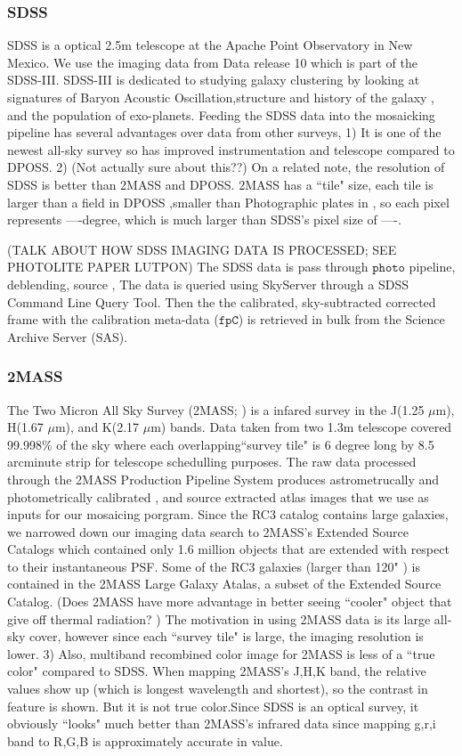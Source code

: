 \documentclass[5p]{elsarticle}
\begin{document}
	\subsubsection{SDSS}
	SDSS is a optical 
	2.5m telescope at the Apache Point Observatory in New Mexico. We use the imaging data from Data release 10 which is part of the SDSS-III. SDSS-III is dedicated to studying galaxy clustering by looking at signatures of Baryon Acoustic Oscillation,structure and history of the galaxy , and the population of exo-planets. Feeding the SDSS data into the mosaicking pipeline has several advantages over data from other surveys, 
1) It is  one of the newest all-sky survey so has improved instrumentation and telescope compared to DPOSS. 
2) (Not actually sure about this??) On a related note, the resolution of SDSS is better than 2MASS and DPOSS.  2MASS has a ``tile" size, each tile is larger than a field in DPOSS ,smaller than Photographic plates in , so each pixel represents ----degree, which is much larger than  SDSS's pixel size of ----. 

(TALK ABOUT HOW SDSS IMAGING DATA IS PROCESSED; SEE PHOTOLITE PAPER LUTPON) 	 The SDSS data is pass through $\texttt{photo}$ pipeline, deblending, source , 
The data is queried using SkyServer through a SDSS Command Line Query Tool. Then the the calibrated, sky-subtracted corrected frame with the calibration meta-data ($\texttt{fpC}$) is retrieved in bulk from the Science Archive Server (SAS). 
	\subsubsection{2MASS}
	 The Two Micron All Sky Survey (2MASS; \citet{2mass}) is a infared survey in the J(1.25 $\mu$m), H(1.67 $\mu$m), and K(2.17 $\mu$m) bands. Data taken from two 1.3m telescope  covered 99.998\% of the sky where each overlapping``survey tile" is 6 degree long by 8.5 arcminute strip for telescope schedulling purposes. The raw data processed through the 2MASS Production Pipeline System produces astrometrucally and photometrically calibrated , and source extracted atlas images that we use as inputs for our mosaicing porgram. Since the RC3 catalog contains large galaxies, we narrowed down our imaging data search to  2MASS's  Extended Source Catalogs which contained only 1.6 million objects that are extended with respect to their instantaneous PSF. %
	 Some of the RC3 galaxies (larger than 120" ) is contained in the 2MASS Large Galaxy Atalas, a subset of the Extended Source Catalog.	(Does 2MASS have more advantage in better seeing ``cooler" object that give off thermal radiation? ) The motivation in using 2MASS data is its large all-sky cover, however since each ``survey tile" is large, the imaging resolution is lower. 3) Also, multiband recombined color image for 2MASS is less of a ``true color" compared to SDSS. When mapping 2MASS's J,H,K band, the relative values show up (which is longest wavelength and shortest), so the contrast in feature is shown. But it is not true color.Since  SDSS is an optical survey, it obviously ``looks" much better than 2MASS's infrared data since mapping g,r,i band to R,G,B is approximately accurate in value. 
\end{document}
